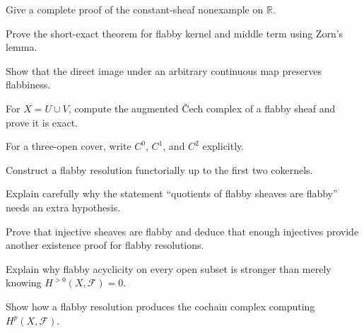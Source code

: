 \begin{problem}\label{prob:vi46-02}
Give a complete proof of the constant-sheaf nonexample on $\mathbb R$.
\end{problem}

\begin{problem}\label{prob:vi46-03}
Prove the short-exact theorem for flabby kernel and middle term using Zorn's lemma.
\end{problem}

\begin{problem}\label{prob:vi46-04}
Show that the direct image under an arbitrary continuous map preserves flabbiness.
\end{problem}

\begin{problem}\label{prob:vi46-05}
For $X=U\cup V$, compute the augmented \v{C}ech complex of a flabby sheaf and prove it is exact.
\end{problem}

\begin{problem}\label{prob:vi46-06}
For a three-open cover, write $C^0$, $C^1$, and $C^2$ explicitly.
\end{problem}

\begin{problem}\label{prob:vi46-07}
Construct a flabby resolution functorially up to the first two cokernels.
\end{problem}

\begin{problem}\label{prob:vi46-08}
Explain carefully why the statement ``quotients of flabby sheaves are flabby'' needs an extra hypothesis.
\end{problem}

\begin{problem}\label{prob:vi46-09}
Prove that injective sheaves are flabby and deduce that enough injectives provide another existence proof for flabby resolutions.
\end{problem}

\begin{problem}\label{prob:vi46-10}
Explain why flabby acyclicity on every open subset is stronger than merely knowing $H^{>0}(X,\mathcal F)=0$.
\end{problem}

\begin{problem}\label{prob:vi46-11}
Show how a flabby resolution produces the cochain complex computing $H^p(X,\mathcal F)$.
\end{problem}

